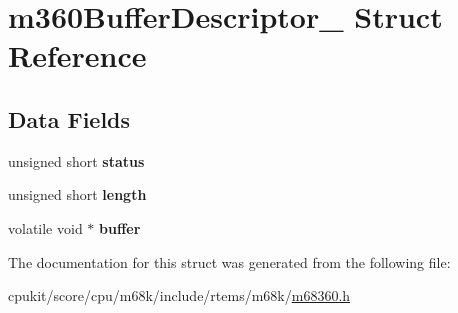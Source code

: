 \hypertarget{structm360BufferDescriptor__}{}\section{m360\+Buffer\+Descriptor\+\_\+ Struct Reference}
\label{structm360BufferDescriptor__}
\subsection*{Data Fields}
\begin{DoxyCompactItemize}
\item 
\mbox{\label{structm360BufferDescriptor___a54eb645956fb5be589346cf122e1f0b1}} 
unsigned short {\bfseries status}
\item 
\mbox{\label{structm360BufferDescriptor___a220407ccde135c8117a6443362939e21}} 
unsigned short {\bfseries length}
\item 
\mbox{\label{structm360BufferDescriptor___a8c96c486b16c10fe08b3a3a8a6d88c1e}} 
volatile void $\ast$ {\bfseries buffer}
\end{DoxyCompactItemize}


The documentation for this struct was generated from the following file\+:\begin{DoxyCompactItemize}
\item 
cpukit/score/cpu/m68k/include/rtems/m68k/\mbox{\hyperlink{m68360_8h}{m68360.\+h}}\end{DoxyCompactItemize}
